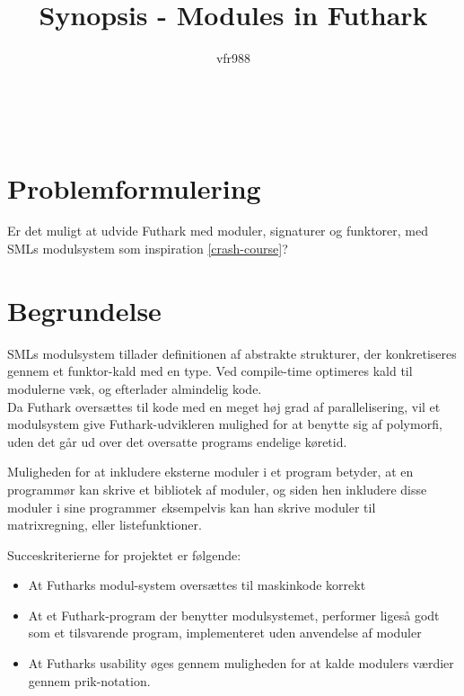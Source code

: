 \documentclass[12pt]{article}
\title{
  Synopsis - Modules in Futhark
}
\author{vfr988}
\begin{document}
\maketitle
\clearpage
\\
\section*{Problemformulering}
Er det muligt at udvide Futhark med moduler, signaturer og funktorer, med SMLs
modulsystem som inspiration \ref{crash-course}?
\\
\section*{Begrundelse}
SMLs modulsystem tillader definitionen af abstrakte strukturer, der
konkretiseres gennem et funktor-kald med en type.
Ved compile-time optimeres kald til modulerne væk, og efterlader almindelig kode.\\
Da Futhark oversættes til kode med en meget høj grad af parallelisering, vil et
modulsystem give Futhark-udvikleren mulighed for at benytte sig af polymorfi,
uden det går ud over det oversatte programs endelige køretid.

Muligheden for at inkludere eksterne moduler i et program betyder, at en
programmør kan skrive et bibliotek af moduler, og siden hen inkludere disse
moduler i sine programmer \emph eksempelvis kan han skrive moduler til
matrixregning, eller listefunktioner.

Succeskriterierne for projektet er følgende:
\begin{itemize}
\item At Futharks modul-system oversættes til maskinkode korrekt
\item At et Futhark-program der benytter modulsystemet, performer ligeså godt
  som et tilsvarende program, implementeret uden anvendelse af moduler
\item At Futharks usability øges gennem muligheden for at kalde modulers værdier
  gennem prik-notation.
\end{itemize}
\end{document}
